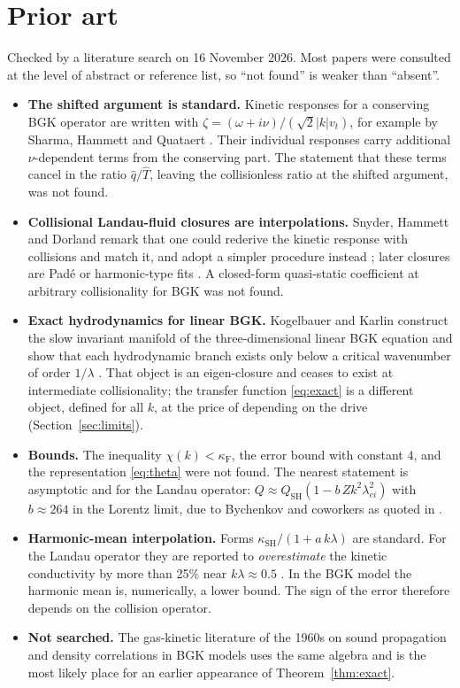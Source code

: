\documentclass[11pt]{article}
\newcommand{\vt}{v_t}
\theoremstyle{remark}
\begin{document}
\section{Prior art}
\label{sec:prior}

Checked by a literature search on 16 November 2026. Most papers were
consulted at the level of abstract or reference list, so ``not found'' is
weaker than ``absent''.
\begin{itemize}
  \item \textbf{The shifted argument is standard.} Kinetic responses for a
    conserving BGK operator are written with
    $\zeta = (\omega+i\nu)/(\sqrt2|k|\vt)$, for example by Sharma, Hammett
    and Quataert \cite{SHQ03}. Their individual responses carry additional
    $\nu$-dependent terms from the conserving part. The statement that these
    terms cancel in the ratio $\hat q/\hat T$, leaving the collisionless
    ratio at the shifted argument, was not found.
  \item \textbf{Collisional Landau-fluid closures are interpolations.}
    Snyder, Hammett and Dorland remark that one could rederive the kinetic
    response with collisions and match it, and adopt a simpler procedure
    instead \cite{SHD97}; later closures are Pad\'e or harmonic-type fits
    \cite{JosephDimits,JiHeld}. A closed-form quasi-static coefficient at
    arbitrary collisionality for BGK was not found.
  \item \textbf{Exact hydrodynamics for linear BGK.} Kogelbauer and Karlin
    construct the slow invariant manifold of the three-dimensional linear
    BGK equation and show that each hydrodynamic branch exists only below a
    critical wavenumber of order $1/\lambda$ \cite{KK}. That object is an
    eigen-closure and ceases to exist at intermediate collisionality; the
    transfer function \eqref{eq:exact} is a different object, defined for
    all $k$, at the price of depending on the drive
    (Section~\ref{sec:limits}).
  \item \textbf{Bounds.} The inequality $\chi(k)<\kappa_{\mathrm F}$, the
    error bound with constant $4$, and the representation \eqref{eq:theta}
    were not found. The nearest statement is asymptotic and for the Landau
    operator: $Q\approx Q_{\mathrm{SH}}(1 - b\,Zk^2\lambda_{ei}^2)$ with
    $b\approx264$ in the Lorentz limit, due to Bychenkov and coworkers as
    quoted in \cite{Brodrick}.
  \item \textbf{Harmonic-mean interpolation.} Forms
    $\kappa_{\mathrm{SH}}/(1+a\,k\lambda)$ are standard. For the Landau
    operator they are reported to \emph{overestimate} the kinetic
    conductivity by more than 25\% near $k\lambda\approx0.5$
    \cite{Brodrick}. In the BGK model the harmonic mean is, numerically, a
    lower bound. The sign of the error therefore depends on the collision
    operator.
  \item \textbf{Not searched.} The gas-kinetic literature of the 1960s on
    sound propagation and density correlations in BGK models uses the same
    algebra and is the most likely place for an earlier appearance of
    Theorem~\ref{thm:exact}.
\end{itemize}
\end{document}
